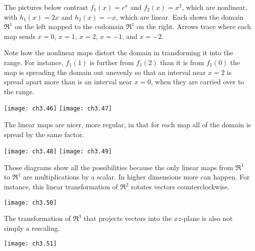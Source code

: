 The pictures below contrast 
\( f_1(x)=e^x \) and \( f_2(x)=x^2 \), which are nonlinear,
with \( h_1(x)=2x \) and \( h_2(x)=-x \), which are linear.
Each shows the domain $\Re^1$ on the left 
mapped to the codomain $\Re^1$ on the right. 
Arrows trace where each map sends
$x=0$, $x=1$, $x=2$, $x=-1$, and $x=-2$.

Note how the nonlinear maps distort
the domain in transforming it into the range.
For instance,
\( f_1(1) \) is further from
$f_1(2)$ than it is from $f_1(0)$ \Dash  the map is spreading 
the domain out unevenly so that  
an interval near $x=2$ is spread apart more 
than is an interval near $x=0$,
when they are carried over to the range.
\begin{center}
  \texttt{[image: ch3.46]}
  \hspace*{3em}
  \texttt{[image: ch3.47]}
\end{center}
The linear maps are nicer, more regular, 
in that for each map all of the domain is 
spread by the same factor.
\begin{center}
  \texttt{[image: ch3.48]}
  \hspace*{3em}
  \texttt{[image: ch3.49]}
\end{center}

Those diagrams show all the possibilities because
the only linear maps from $\Re^1$ to $\Re^1$ are multiplications by a scalar. 
In higher dimensions more can happen. 
For instance, this linear transformation of $\Re^2$
rotates vectors counterclockwise.
\begin{center}
  \texttt{[image: ch3.50]}
\end{center}
The transformation of $\Re^3$ 
that projects vectors into the $xz$-plane
is also not simply a rescaling.
\begin{center}
 \texttt{[image: ch3.51]}
\end{center}

